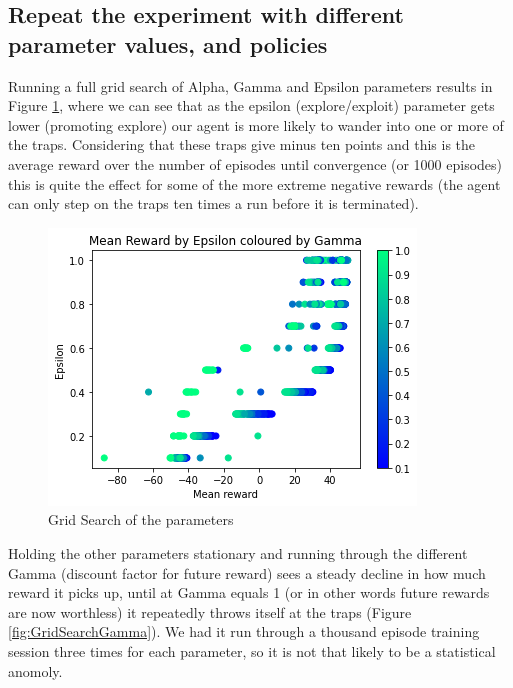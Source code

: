 \documentclass[a4pape, 11pt, english]{article}
\begin{document}
\subsection{Repeat the experiment with different parameter values, and policies}
Running a full grid search of Alpha, Gamma and Epsilon parameters results in Figure \ref{fig:GridSearchColorGamma}, where we can see that as the epsilon (explore/exploit) parameter gets lower (promoting explore) our agent is more likely to wander into one or more of the traps. Considering that these traps give minus ten points and this is the average reward over the number of episodes until convergence (or 1000 episodes) this is quite the effect for some of the more extreme negative rewards (the agent can only step on the traps ten times a run before it is terminated).

\begin{figure}[h!]
	\begin{center}
		\includegraphics[scale=0.8]{img/GridSearchRewardEpsilonGamma.png}
		\caption{Grid Search of the parameters}
		\label{fig:GridSearchColorGamma}
	\end{center}
\end{figure}

Holding the other parameters stationary and running through the different Gamma (discount factor for future reward) sees a steady decline in how much reward it picks up, until at Gamma equals 1 (or in other words future rewards are now worthless) it repeatedly throws itself at the traps (Figure \ref{fig:GridSearchGamma}). We had it run through a thousand episode training session three times for each parameter, so it is not that likely to be a statistical anomoly.
\end{document}
